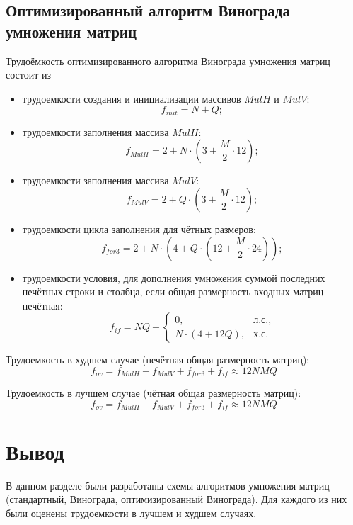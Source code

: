 \subsection{Оптимизированный алгоритм Винограда умножения матриц}

Трудоёмкость оптимизированного алгоритма Винограда умножения матриц состоит из
\begin{itemize}
	\item трудоемкости создания и инициализации массивов $MulH$ и $MulV$:
	\begin{equation}
		\label{for:impr_init}
		f_{init} = N + Q;
	\end{equation}
	
	\item трудоемкости заполнения массива $MulH$:
	\begin{equation}
		\label{for:impr_MulH}
		f_{MulH} = 2 + N \cdot (3 + \frac{M}{2} \cdot 12);
	\end{equation}
	
	\item трудоемкости заполнения массива $MulV$:
	\begin{equation}
		\label{for:impr_MulV}
		f_{MulV} = 2 + Q \cdot (3 + \frac{M}{2} \cdot 12);
	\end{equation}
	
	\item трудоемкости цикла заполнения для чётных размеров:
	\begin{equation}
		\label{for:impr_cycle}
		f_{for3} = 2 + N \cdot (4 + Q \cdot (12 + \frac{M}{2} \cdot 24));
	\end{equation}
	
	\item трудоемкости условия, для дополнения умножения суммой последних нечётных строки и столбца, если общая размерность входных матриц нечётная:
	\begin{equation}
		\label{for:if}
		f_{if} = NQ +
		\begin{cases}
			0, & \text{л.с.,}\\
			N \cdot (4 + 12Q), & \text{х.с.}
		\end{cases}
	\end{equation}
\end{itemize}

Трудоемкость в худшем случае (нечётная общая размерность матриц):
\begin{equation}
	\label{for:bad_impr}
	f_{ov} = f_{MulH} + f_{MulV} + f_{for3} + f_{if} \approx 12NMQ
\end{equation}

Трудоемкость в лучшем случае (чётная общая размерность матриц):
\begin{equation}
	\label{for:good_impr}
	f_{ov} = f_{MulH} + f_{MulV} + f_{for3} + f_{if} \approx 12NMQ
\end{equation}

\section*{Вывод}

В данном разделе были разработаны схемы алгоритмов умножения матриц (стандартный, Винограда, оптимизированный Винограда). Для каждого из них были оценены трудоемкости в лучшем и худшем случаях.